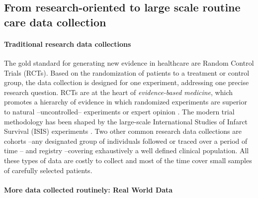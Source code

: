 \documentclass[french,12pt,twoside,a4paper]{book}
\begin{document}
\begin{background_box_left}

  \subsection{From research-oriented to large scale routine care data collection}%
  \label{subsec:intro:data_collections}

  \paragraph{Traditional research data collections}
  The gold standard for generating new evidence in healthcare are Random Control
  Trials (RCTs). Based on the randomization of patients to a treatment or
  control group, the data collection is designed for one experiment, addressing
  one precise research question. RCTs are at the heart of \emph{evidence-based
    medicine}, which promotes a hierarchy of evidence in which randomized
  experiments are superior to natural --uncontrolled-- experiments or expert
  opinion \citep{guyatt1995users}. The modern trial methodology has been shaped
  by the large-scale International Studies of Infarct Survival (ISIS)
  experiments \citep{isis1_randomised_1986}. Two other common research data
  collections are cohorts --any designated group of individuals followed or
  traced over a period of time \citep{porta2014dictionary}-- and registry
  --covering exhaustively a well defined clinical population. All these types of
  data are costly to collect and most of the time cover small samples of
  carefully selected patients.




  \paragraph{More data collected routinely: Real World Data}%
  \label{subsec:intro:real_world_data}


\end{background_box_left}
\end{document}
